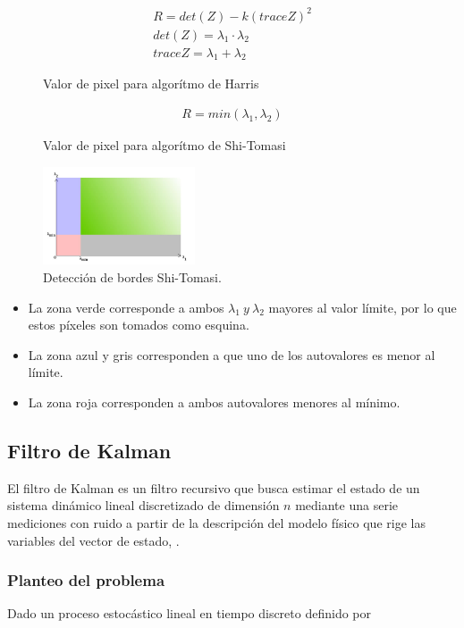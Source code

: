 \begin{figure}[H]
\begin{align}
R= det(Z) - k (trace Z )^2 \\
det(Z)= \lambda_1 \cdot \lambda_2 \\
trace Z = \lambda_1 + \lambda_2
\end{align}
\label{eq:harris}
\caption{Valor de pixel para algorítmo de Harris}
\end{figure}

\begin{figure}[H]
\begin{align}
R= min(\lambda_1 , \lambda_2)
\end{align}
\label{eq:shitom}
\caption{Valor de pixel para algorítmo de Shi-Tomasi}
\end{figure}

\begin{figure}[H]
\centering
	\includegraphics[width=0.4\textwidth]{Imagenes/shitom.png}
	\caption{Detección de bordes Shi-Tomasi.}
	\label{fig:shitom}

\end{figure}
\begin{itemize}
\item La zona verde corresponde a ambos $\lambda_1 \ y \ \lambda_2 $ mayores al valor límite, por lo que estos píxeles son tomados como esquina.
\item La zona azul y gris corresponden a que uno de los autovalores es menor al límite.
\item La zona roja corresponden a ambos autovalores menores al mínimo.
\end{itemize}
\subsection{Filtro de Kalman}
El filtro de Kalman es un filtro recursivo que busca estimar el estado de un sistema dinámico lineal discretizado de dimensión $n$ mediante una serie mediciones con ruido a partir de la descripción del modelo físico que rige las variables del vector de estado\cite{ref:kalman1}, \cite{ref:kalman2}.

\subsubsection{Planteo del problema}
Dado un proceso estocástico lineal en tiempo discreto definido por

